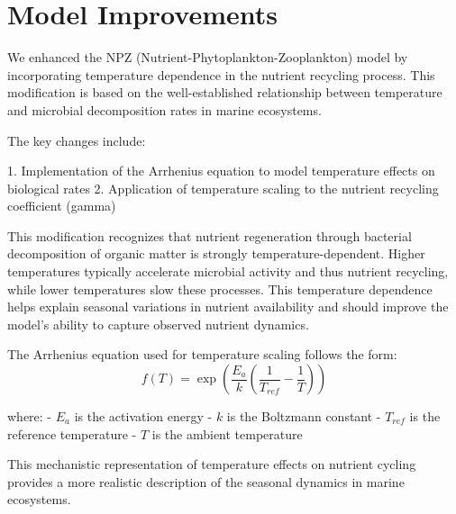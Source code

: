 \section{Model Improvements}

We enhanced the NPZ (Nutrient-Phytoplankton-Zooplankton) model by incorporating temperature dependence in the nutrient recycling process. This modification is based on the well-established relationship between temperature and microbial decomposition rates in marine ecosystems.

The key changes include:

1. Implementation of the Arrhenius equation to model temperature effects on biological rates
2. Application of temperature scaling to the nutrient recycling coefficient (gamma)

This modification recognizes that nutrient regeneration through bacterial decomposition of organic matter is strongly temperature-dependent. Higher temperatures typically accelerate microbial activity and thus nutrient recycling, while lower temperatures slow these processes. This temperature dependence helps explain seasonal variations in nutrient availability and should improve the model's ability to capture observed nutrient dynamics.

The Arrhenius equation used for temperature scaling follows the form:
\[ f(T) = \exp\left(\frac{E_a}{k}\left(\frac{1}{T_{ref}} - \frac{1}{T}\right)\right) \]

where:
- $E_a$ is the activation energy
- $k$ is the Boltzmann constant
- $T_{ref}$ is the reference temperature
- $T$ is the ambient temperature

This mechanistic representation of temperature effects on nutrient cycling provides a more realistic description of the seasonal dynamics in marine ecosystems.
